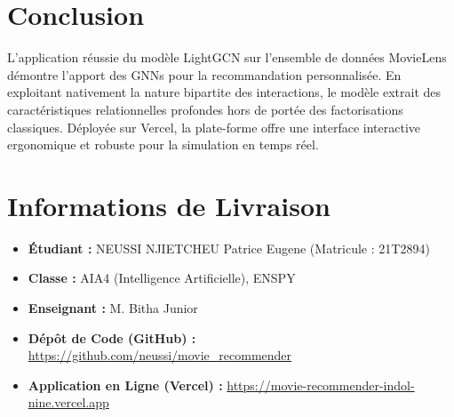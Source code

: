 \documentclass[12pt,a4paper]{article}
\begin{document}
\section{Conclusion}
L'application réussie du modèle LightGCN sur l'ensemble de données MovieLens démontre l'apport des GNNs pour la recommandation personnalisée. En exploitant nativement la nature bipartite des interactions, le modèle extrait des caractéristiques relationnelles profondes hors de portée des factorisations classiques. Déployée sur Vercel, la plate-forme offre une interface interactive ergonomique et robuste pour la simulation en temps réel.

\newpage
\section*{Informations de Livraison}
\begin{itemize}
    \item \textbf{Étudiant :} NEUSSI NJIETCHEU Patrice Eugene (Matricule : 21T2894)
    \item \textbf{Classe :} AIA4 (Intelligence Artificielle), ENSPY
    \item \textbf{Enseignant :} M. Bitha Junior
    \item \textbf{Dépôt de Code (GitHub) :} \url{https://github.com/neussi/movie_recommender}
    \item \textbf{Application en Ligne (Vercel) :} \url{https://movie-recommender-indol-nine.vercel.app}
\end{itemize}
\end{document}
